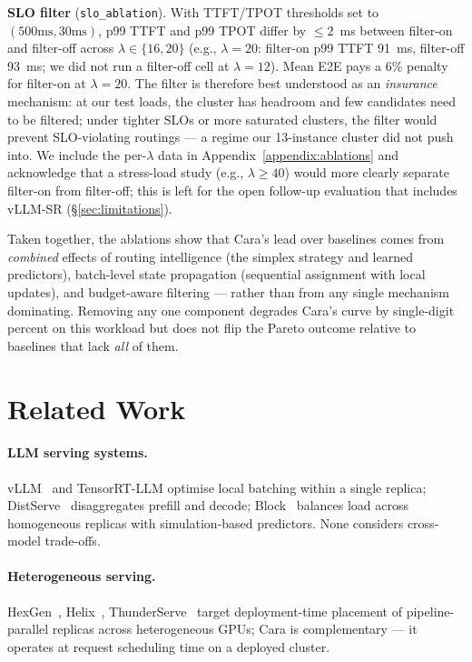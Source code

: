 \documentclass[10pt]{article}
\begin{document}
\textbf{SLO filter} (\texttt{slo\_ablation}). With TTFT/TPOT thresholds set to $(500\text{ms}, 30\text{ms})$, p99 TTFT and p99 TPOT differ by $\le 2$~ms between filter-on and filter-off across $\lambda \in \{16, 20\}$ (e.g., $\lambda{=}20$: filter-on p99 TTFT 91~ms, filter-off 93~ms; we did not run a filter-off cell at $\lambda{=}12$). Mean E2E pays a 6\% penalty for filter-on at $\lambda{=}20$. The filter is therefore best understood as an \emph{insurance} mechanism: at our test loads, the cluster has headroom and few candidates need to be filtered; under tighter SLOs or more saturated clusters, the filter would prevent SLO-violating routings — a regime our 13-instance cluster did not push into. We include the per-$\lambda$ data in Appendix~\ref{appendix:ablations} and acknowledge that a stress-load study (e.g., $\lambda \ge 40$) would more clearly separate filter-on from filter-off; this is left for the open follow-up evaluation that includes vLLM-SR (\S\ref{sec:limitations}).

Taken together, the ablations show that Cara's lead over baselines comes from \emph{combined} effects of routing intelligence (the simplex strategy and learned predictors), batch-level state propagation (sequential assignment with local updates), and budget-aware filtering — rather than from any single mechanism dominating. Removing any one component degrades Cara's curve by single-digit percent on this workload but does not flip the Pareto outcome relative to baselines that lack \emph{all} of them.

\section{Related Work}\label{sec:related}

\paragraph{LLM serving systems.} vLLM~\cite{kwon2023vllm} and TensorRT-LLM optimise local batching within a single replica; DistServe~\cite{zhong2024distservedisaggregatingprefilldecoding} disaggregates prefill and decode; Block~\cite{da2025blockbalancingloadllm} balances load across homogeneous replicas with simulation-based predictors. None considers cross-model trade-offs.

\paragraph{Heterogeneous serving.} HexGen~\cite{hexgen}, Helix~\cite{helix}, ThunderServe~\cite{thunderserve} target deployment-time placement of pipeline-parallel replicas across heterogeneous GPUs; Cara is complementary — it operates at request scheduling time on a deployed cluster.
\end{document}
